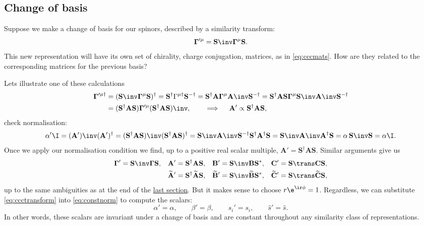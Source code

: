 \documentclass[11pt]{article}
\newcommand{\invd}{^{-\dag}}
\newcommand{\cc}{^\ast}
\newcommand{\hc}{^\dag}
\newcommand{\Gammab}{\boldsymbol{\Gamma}}
\newcommand{\mud}{^{\mu\dag}}
\newcommand{\pmud}{^{\prime\mu\dag}}
\renewcommand{\S}{\mathbf{S}}
\newcommand{\A}{\mathbf{A}}
\newcommand{\B}{\mathbf{B}}
\renewcommand{\C}{\mathbf{C}}
\newcommand{\At}{\widetilde{\A}}
\newcommand{\Bt}{\widetilde{\B}}
\newcommand{\Ct}{\widetilde{\C}}
\newcommand{\sh}{\hat{s}}
\begin{document}

\subsection{Change of basis}\label{sec:basis}

Suppose we make a change of basis for our spinors, described by a similarity transform:
%
\begin{equation*}
  \Gammab'^{\mu} = \S\inv \Gammab^\mu \S.
\end{equation*}
%
This new representation will have its own set of chirality, charge conjugation, \etc matrices, as in \cref{eq:cccmats}.
How are they related to the corresponding matrices for the previous basis?

Lets illustrate one of these calculations
%
\begin{align*}
  \Gammab\pmud
    &= (\S\inv \Gammab^\mu \S)\hc
    = \S\hc \Gamma\mud \S\invd
    = \S\hc \A \Gammab^\mu \A\inv \S\invd
    = \S\hc \A \S \Gammab^\mu \S\inv \A\inv \S\invd \\
    &= (\S\hc \A \S) \Gammab'^\mu (\S\hc \A \S)\inv,
    \qquad \implies \quad
    \A' \propto \S\hc \A \S,
\end{align*}
%
check normalisation:
%
\begin{equation*}
  \alpha' \I
    = (\A')\inv (\A')\hc 
    = (\S\hc \A \S)\inv (\S\hc \A \S)\hc 
    = \S\inv \A\inv \S\invd \S\hc \A\hc \S 
    = \S\inv \A\inv \A\hc \S 
    = \alpha\, \S\inv \S 
    = \alpha \I.
\end{equation*}
%
Once we apply our normalisation condition we find, up to a positive real scalar multiple,
\( \A' = \S\hc \A \S \).
Similar arguments give us
%
\begin{equation}\label{eq:ccctransform}
\begin{aligned}
  \Gammab' &= \S\inv \Gammab \S, &
  \A' &= \S\hc \A \S, &
  \B' &= \S\inv \B \S\cc, &
  \C' &= \S\trans \C \S,
\\ &&
  \At' &= \S\hc \At \S, &
  \Bt' &= \S\inv \Bt \S\cc, &
  \Ct' &= \S\trans \Ct \S,
\end{aligned}
\end{equation}
%
up to the same ambiguities as at the end of the \hyperref[eq:constnorm]{last section}.
But it makes sense to choose \( r \e^{\ir\phi} = 1 \).
Regardless, we can substitute \cref{eq:ccctransform} into \cref{eq:constnorm} to compute the scalars:
%
\begin{equation*}
  \alpha' = \alpha, \qquad
  \beta' = \beta, \qquad
  s_i' = s_i, \qquad
  \sh' = \sh.
\end{equation*}
%
In other words, these scalars are invariant under a change of basis and are constant throughout any similarity class of representations.
\end{document}
